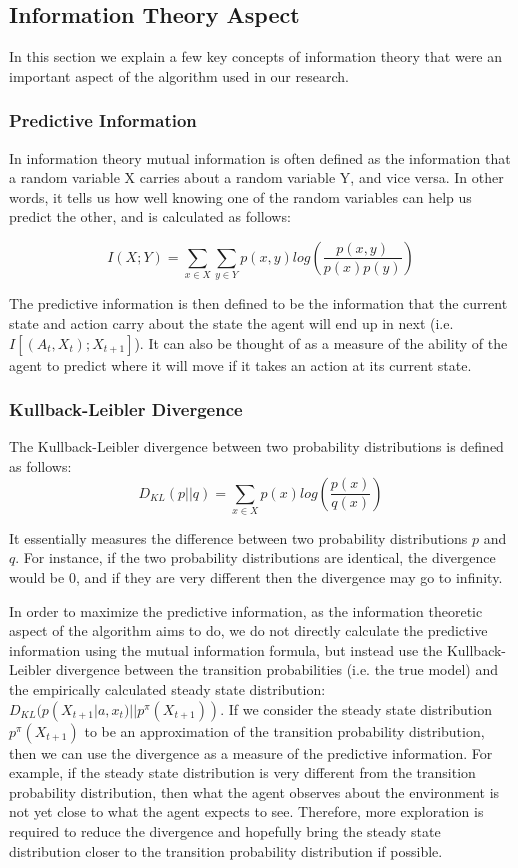 \documentclass{acm_proc_article-sp}
\begin{document}
\subsection{Information Theory Aspect}

In this section we explain a few key concepts of information theory that were an important aspect of the algorithm used in our research.

\subsubsection{Predictive Information}

In information theory mutual information is often defined as the information that a random variable X carries about a random variable Y, and vice versa. In other words, it tells us how well knowing one of the random variables can help us predict the other, and is calculated as follows:

\[I(X; Y) = \sum_{x \in X}\sum_{y \in Y}p(x,y)log(\frac{p(x,y)}{p(x)p(y)})\]

The predictive information is then defined to be the information that the current state and action carry about the state the agent will end up in next (i.e. $I[(A_t,X_t); X_{t+1}]$). It can also be thought of as a measure of the ability of the agent to predict where it will move if it takes an action at its current state. 

\subsubsection{Kullback-Leibler Divergence}

The Kullback-Leibler divergence between two probability distributions is defined as follows: 
\[D_{KL}(p || q) = \sum_{x \in X} p(x)log(\frac{p(x)}{q(x)})\]

It essentially measures the difference between two probability distributions $p$ and $q$. For instance, if the two probability distributions are identical, the divergence would be 0, and if they are very different then the divergence may go to infinity.

In order to maximize the predictive information, as the information theoretic aspect of the algorithm aims to do, we do not directly calculate the predictive information using the mutual information formula, but instead use the Kullback-Leibler divergence between the transition probabilities (i.e. the true model) and the empirically calculated steady state distribution: $D_{KL}(p(X_{t+1}|a, x_t) || p^\pi(X_{t+1}))$. If we consider the steady state distribution $p^\pi(X_{t+1})$ to be an approximation of the transition probability distribution, then we can use the divergence as a measure of the predictive information. For example, if the steady state distribution is very different from the transition probability distribution, then what the agent observes about the environment is not yet close to what the agent expects to see. Therefore, more exploration is required to reduce the divergence and hopefully bring the steady state distribution closer to the transition probability distribution if possible. 
\end{document}
